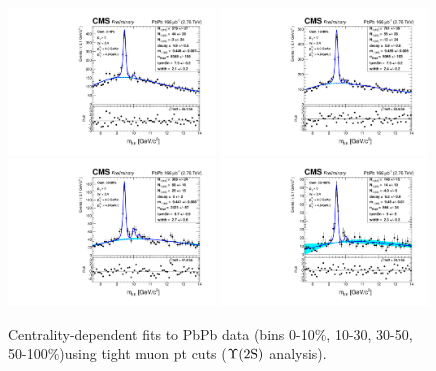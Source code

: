 \begin{figure}
  \includegraphics[width=0.49\textwidth]{Chapters/aYield/PbPb/pt_4_4/Centrality/Cent_0_10/PbPb_Cent_0_10_fsr1.pdf}
  \includegraphics[width=0.49\textwidth]{Chapters/aYield/PbPb/pt_4_4/Centrality/Cent_10_30/PbPb_Cent_10_30_fsr1.pdf}
  \includegraphics[width=0.49\textwidth]{Chapters/aYield/PbPb/pt_4_4/Centrality/Cent_30_50/PbPb_Cent_30_50_fsr1.pdf}
  \includegraphics[width=0.49\textwidth]{Chapters/aYield/PbPb/pt_4_4/Centrality/Cent_50_100/PbPb_Cent_50_100_fsr1.pdf}
 \caption{Centrality-dependent fits to PbPb data (bins 0-10$\%$,
   10-30, 30-50,
  50-100$\%$)using tight muon
   pt cuts ($\Upsilon\mathrm{(2S)}$ analysis).}
 \label{fig:YieldsCent2S} 
\end{figure}

